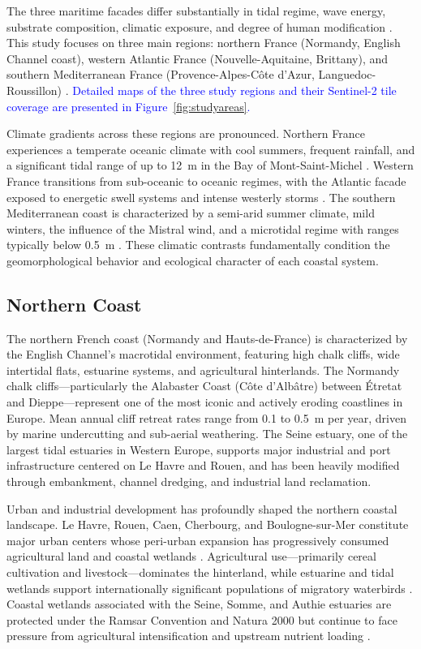 \documentclass[coasts,article,submit,pdftex,moreauthors]{Definitions/mdpi}
\begin{document}
The three maritime facades differ substantially in tidal regime, wave energy, substrate composition, climatic exposure, and degree of human modification \citep{paskoff2001geomorphologie}. This study focuses on three main regions: northern France (Normandy, English Channel coast), western Atlantic France (Nouvelle-Aquitaine, Brittany), and southern Mediterranean France (Provence-Alpes-C\^ote d'Azur, Languedoc-Roussillon) \citep{deboudt2012atlas}. \textcolor{blue}{Detailed maps of the three study regions and their Sentinel-2 tile coverage are presented in Figure~\ref{fig:studyareas}.}

Climate gradients across these regions are pronounced. Northern France experiences a temperate oceanic climate with cool summers, frequent rainfall, and a significant tidal range of up to 12~m in the Bay of Mont-Saint-Michel \citep{bonnot-courtois2002mont}. Western France transitions from sub-oceanic to oceanic regimes, with the Atlantic facade exposed to energetic swell systems and intense westerly storms \citep{suanez2012tempetes}. The southern Mediterranean coast is characterized by a semi-arid summer climate, mild winters, the influence of the Mistral wind, and a microtidal regime with ranges typically below 0.5~m \citep{certain2002golfe}. These climatic contrasts fundamentally condition the geomorphological behavior and ecological character of each coastal system.


\subsection{Northern Coast}

The northern French coast (Normandy and Hauts-de-France) is characterized by the English Channel's macrotidal environment, featuring high chalk cliffs, wide intertidal flats, estuarine systems, and agricultural hinterlands. The Normandy chalk cliffs—particularly the Alabaster Coast (C\^ote d'Alb\^atre) between Étretat and Dieppe—represent one of the most iconic and actively eroding coastlines in Europe. Mean annual cliff retreat rates range from 0.1 to 0.5~m per year, driven by marine undercutting and sub-aerial weathering. The Seine estuary, one of the largest tidal estuaries in Western Europe, supports major industrial and port infrastructure centered on Le Havre and Rouen, and has been heavily modified through embankment, channel dredging, and industrial land reclamation.

Urban and industrial development has profoundly shaped the northern coastal landscape. Le Havre, Rouen, Caen, Cherbourg, and Boulogne-sur-Mer constitute major urban centers whose peri-urban expansion has progressively consumed agricultural land and coastal wetlands \citep{dauvin2011estuaire}. Agricultural use—primarily cereal cultivation and livestock—dominates the hinterland, while estuarine and tidal wetlands support internationally significant populations of migratory waterbirds \citep{femenias2011estuaire}. Coastal wetlands associated with the Seine, Somme, and Authie estuaries are protected under the Ramsar Convention and Natura 2000 but continue to face pressure from agricultural intensification and upstream nutrient loading \citep{billen2007piren}.
\end{document}
